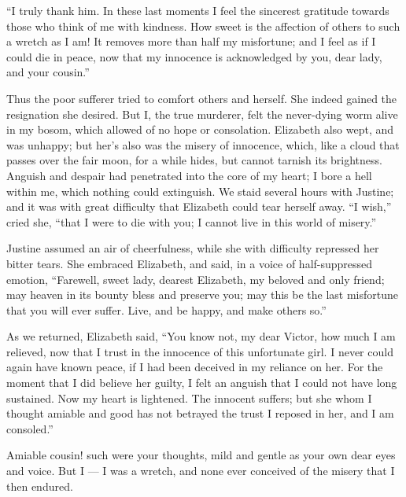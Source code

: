 ``I truly thank him. In these last
moments I feel the sincerest gratitude
towards those who think of me with
kindness. How sweet is the affection
of others to such a wretch as I am!
It removes more than half my misfortune;
and I feel as if I could die in
peace, now that my innocence is acknowledged
by you, dear lady, and
your cousin.''

Thus the poor sufferer tried to comfort
others and herself. She indeed
gained the resignation she desired.
But I, the true murderer, felt the never-dying
worm alive in my bosom, which
allowed of no hope or consolation.
Elizabeth also wept, and was unhappy;
but her's also was the misery of innocence,
which, like a cloud that passes
over the fair moon, for a while hides,
but cannot tarnish its brightness. Anguish
and despair had penetrated into
the core of my heart; I bore a hell
within me, which nothing could extinguish.
We staid several hours with
Justine; and it was with great difficulty
that Elizabeth could tear herself
away. ``I wish,'' cried she, ``that I
were to die with you; I cannot live in
this world of misery.''

Justine assumed an air of
cheerfulness, while she with difficulty repressed
her bitter tears. She embraced Elizabeth,
and said, in a voice of half-suppressed
emotion, ``Farewell, sweet lady,
dearest Elizabeth, my belov\-ed and only
friend; may heaven in its bounty bless
and preserve you; may this be the last
misfortune that you will ever suffer.
Live, and be happy, and make others
so.''

As we returned, Elizabeth said, ``You
know not, my dear Victor, how much I
am relieved, now that I trust in the innocence
of this unfortunate girl. I
never could again have known peace,
if I had been deceived in my reliance
on her. For the moment that I did
believe her guilty, I felt an anguish
that I could not have long sustained.
Now my heart is lightened. The innocent
suffers; but she whom I thought
amiable and good has not betrayed the
trust I reposed in her, and I am consoled.''

Amiable cousin! such were your
thoughts, mild and gentle as your own
dear eyes and voice. But I --- I was a
wretch, and none ever conceived of the
misery that I then endured.



